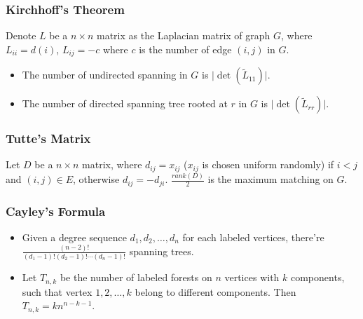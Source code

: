 
\subsubsection{Kirchhoff's Theorem}
Denote $L$ be a $n \times n$ matrix as the Laplacian matrix of graph $G$, where $L_{ii} = d(i)$, $L_{ij} = -c$ where $c$ is the number of edge $(i, j)$ in $G$.
\begin{itemize}
    \item The number of undirected spanning in $G$ is $\lvert \det(\tilde{L}_{11}) \rvert$.
    \item The number of directed spanning tree rooted at $r$ in $G$ is $\lvert \det(\tilde{L}_{rr}) \rvert$.
\end{itemize}

\subsubsection{Tutte's Matrix}
Let $D$ be a $n \times n$ matrix, where $d_{ij} = x_{ij}$ ($x_{ij}$ is chosen uniform randomly) if $i < j$ and $(i, j) \in E$, otherwise $d_{ij} = -d_{ji}$. $\frac{rank(D)}{2}$ is the maximum matching on $G$.

\subsubsection{Cayley's Formula}
\begin{itemize}
  \item Given a degree sequence $d_1, d_2, \ldots, d_n$ for each labeled vertices, there're $\frac{(n - 2)!}{(d_1 - 1)!(d_2 - 1)!\cdots(d_n - 1)!}$ spanning trees.
  \item Let $T_{n, k}$ be the number of labeled forests on $n$ vertices with $k$ components, such that vertex $1, 2, \ldots, k$ belong to different components. Then $T_{n, k} = kn^{n - k - 1}$.
\end{itemize}
